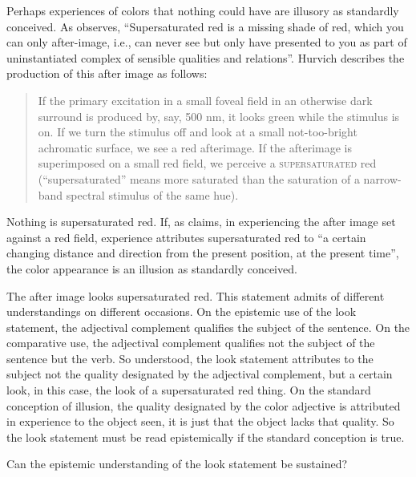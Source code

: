 \documentclass[12pt]{article}
\begin{document}
Perhaps experiences of colors that nothing could have are illusory as standardly conceived. As \citet[142]{Johnston:2004kx} observes, ``Supersaturated red is a missing shade of red, which you can only after-image, i.e., can never see but only have presented to you as part of uninstantiated complex of sensible qualities and relations''. Hurvich describes the production of this after image as follows:
\begin{quote}
	If the primary excitation in a small foveal field in an otherwise dark surround is produced by, say, 500 nm, it looks green while the stimulus is on. If we turn the stimulus off and look at a small not-too-bright achromatic surface, we see a red afterimage. If the afterimage is superimposed on a small red field, we perceive a \textsc{supersaturated} red (``supersaturated'' means more saturated than the saturation of a narrow-band spectral stimulus of the same hue). \citep[187]{Hurvich:1981kx}
\end{quote}
Nothing is supersaturated red. If, as \citet[142]{Johnston:2004kx} claims, in experiencing the after image set against a red field, experience attributes supersaturated red to ``a certain changing distance and direction from the present position, at the present time'', the color appearance is an illusion as standardly conceived.

The after image looks supersaturated red. This statement admits of different understandings on different occasions. On the epistemic use of the look statement, the adjectival complement qualifies the subject of the sentence. On the comparative use, the adjectival complement qualifies not the subject of the sentence but the verb. So understood, the look statement attributes to the subject not the quality designated by the adjectival complement, but a certain look, in this case, the look of a supersaturated red thing. On the standard conception of illusion, the quality designated by the color adjective is attributed in experience to the object seen, it is just that the object lacks that quality. So the look statement must be read epistemically if the standard conception is true. 

Can the epistemic understanding of the look statement be sustained?
\end{document}
